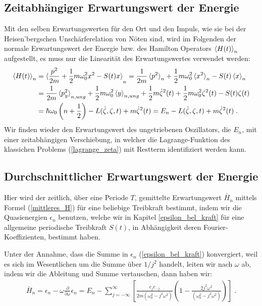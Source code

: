   \subsection{Zeitabhängiger Erwartungswert der Energie}
    Mit den selben Erwartungswerten für den Ort und den Impuls, wie sie bei der Heisen'bergschen Unschärferelation von Nöten sind, wird im Folgenden der normale Erwartungswert der Energie bzw. des Hamilton Operators $\braket{H(t)}_n$ aufgestellt, es muss nur die Linearität des Erwartungswertes verwendet werden:
    \begin{align}
      \braket{H(t)}_n &= \braket{\frac{p^2}{2m} + \frac{1}{2}m\omega_0^2x^2 - S(t)x}_n
      =\frac{1}{2m}\braket{p^2}_n + \frac{1}{2}m\omega_0^2\braket{x^2}_n - S(t)\braket{x}_n \notag\\
      &= \frac{1}{2m}\braket{p^2_y}_{n,ung} + \frac{1}{2}m\omega_0^2\braket{y}_{n,ung} + \frac{1}{2}m\dot{\zeta}^2(t) + \frac{1}{2}m\omega_0^2\zeta^2(t) - S(t)\zeta(t) \notag\\
      &= \hbar\omega_0\left(n+\frac{1}{2}\right) - L(\dot{\zeta},\zeta,t) + m\dot{\zeta}^2(t) = E_n - L(\dot{\zeta},\zeta,t) + m\dot{\zeta}^2(t) \; .
    \end{align}
    Wir finden wieder den Erwartungswert des ungetriebenen Oszillators, die $E_n$, mit einer zeitabhängigen Verschiebung, in welcher die Lagrange-Funktion des klassichen Problems (\ref{lagrange_zeta}) mit Restterm identifiziert werden kann.

  \subsection{Durchschnittlicher Erwartungswert der Energie}
    Hier wird der zeitlich, über eine Periode $T$, gemittelte Erwartungswert $\bar H_n$ mittels Formel (\ref{mittleres_H}) für eine beliebige Treibkraft bestimmt, indem wir die Quasienergien $\epsilon_n$ benutzen, welche wir in Kapitel \ref{epsilon_bel_kraft} für eine allgemeine periodische Treibkraft $S(t)$, in Abhängigkeit deren Fourier-Koeffizienten, bestimmt haben.

    Unter der Annahme, dass die Summe in $\epsilon_n$ (\ref{epsilon_bel_kraft}) konvergiert, weil es sich im Wesentlichen um die Summe über $1/j^2$ handelt, leiten wir nach $\omega$ ab, indem wir die Ableitung und Summe vertauschen, dann haben wir:
    \begin{align}
      \bar H_n = \epsilon_n - \omega\frac{\partial}{\partial \omega}\epsilon_n
      = E_n - \sum_{j=-\infty}^{\infty} \left[ \frac{c_jc_{-j}}{2m(\omega_0^2-j^2\omega^2)}\left( 1-\frac{2j^2\omega^2}{(\omega_0^2-j^2\omega^2)}\right) \right] \; .
    \end{align}

